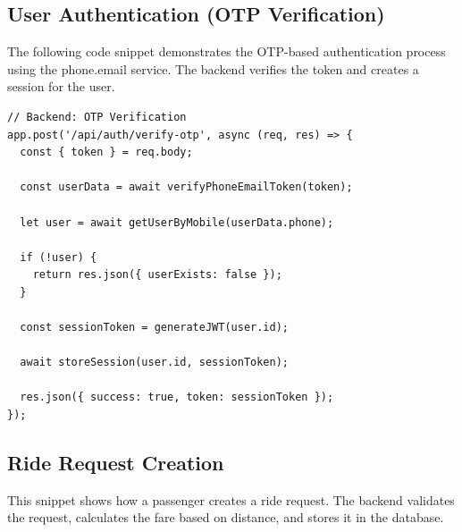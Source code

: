 \documentclass[10pt,a4paper]{report}
\begin{document}
\subsection{User Authentication (OTP Verification)}

\justify\large The following code snippet demonstrates the OTP-based authentication process using the phone.email service. The backend verifies the token and creates a session for the user.

\begin{verbatim}
// Backend: OTP Verification
app.post('/api/auth/verify-otp', async (req, res) => {
  const { token } = req.body;

  const userData = await verifyPhoneEmailToken(token);

  let user = await getUserByMobile(userData.phone);

  if (!user) {
    return res.json({ userExists: false });
  }

  const sessionToken = generateJWT(user.id);

  await storeSession(user.id, sessionToken);

  res.json({ success: true, token: sessionToken });
});
\end{verbatim}

\subsection{Ride Request Creation}

\justify\large This snippet shows how a passenger creates a ride request. The backend validates the request, calculates the fare based on distance, and stores it in the database.
\end{document}
